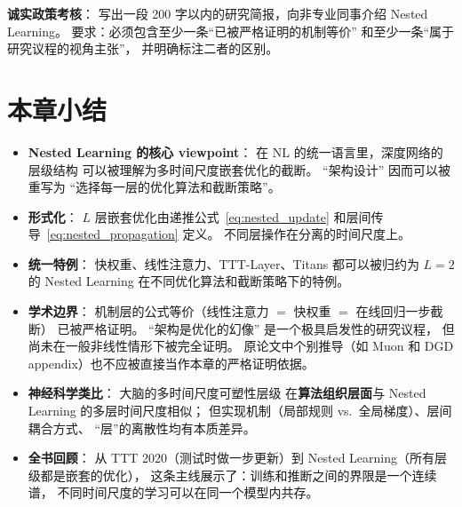 \begin{exercise}
\textbf{诚实政策考核}：
写出一段 200 字以内的研究简报，向非专业同事介绍 Nested Learning。
要求：必须包含至少一条``已被严格证明的机制等价''
和至少一条``属于研究议程的视角主张''，
并明确标注二者的区别。
\end{exercise}

\section{本章小结}
\label{sec:nested_summary}

\begin{itemize}
  \item \textbf{Nested Learning 的核心 viewpoint}：
    在 NL 的统一语言里，深度网络的层级结构
    可以被理解为多时间尺度嵌套优化的截断。
    ``架构设计'' 因而可以被重写为
    ``选择每一层的优化算法和截断策略''。

  \item \textbf{形式化}：
    $L$ 层嵌套优化由递推公式~\eqref{eq:nested_update}
    和层间传导~\eqref{eq:nested_propagation} 定义。
    不同层操作在分离的时间尺度上。

  \item \textbf{统一特例}：
    快权重、线性注意力、TTT-Layer、Titans
    都可以被归约为 $L=2$ 的 Nested Learning
    在不同优化算法和截断策略下的特例。

  \item \textbf{学术边界}：
    机制层的公式等价（线性注意力 $=$ 快权重 $=$ 在线回归一步截断）
    已被严格证明。
    ``架构是优化的幻像'' 是一个极具启发性的研究议程，
    但尚未在一般非线性情形下被完全证明。
    原论文中个别推导（如 Muon 和 DGD appendix）也不应被直接当作本章的严格证明依据。

  \item \textbf{神经科学类比}：
    大脑的多时间尺度可塑性层级
    在\textbf{算法组织层面}与 Nested Learning 的多层时间尺度相似；
    但实现机制（局部规则 vs.\ 全局梯度）、层间耦合方式、
    ``层''的离散性均有本质差异。

  \item \textbf{全书回顾}：
    从 TTT 2020（测试时做一步更新）到 Nested Learning（所有层级都是嵌套的优化），
    这条主线展示了：训练和推断之间的界限是一个连续谱，
    不同时间尺度的学习可以在同一个模型内共存。
\end{itemize}

